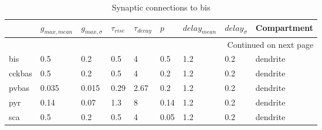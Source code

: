 \begin{longtable}{lllllllll}
\caption{Synaptic connections to bis}\label{bis_synapses}\\
\toprule
{} &   $g_{max, mean}$ & $g_{max, \sigma}$ & $\tau_{rise}$ & $\tau_{decay}$ &  $p$ & $delay_{mean}$ & $delay_{\sigma}$ & Compartment \\
\midrule
\endhead
\midrule
\multicolumn{9}{r}{{Continued on next page}} \\
\midrule
\endfoot

\bottomrule
\endlastfoot
bis    &    0.5 &      0.2 &      0.5 &         4 &   0.5 &   1.2 &       0.2 &      dendrite\ \\
cckbas &    0.5 &      0.2 &      0.5 &         4 &   0.2 &   1.2 &       0.2 &      dendrite\ \\
pvbas  &  0.035 &    0.015 &     0.29 &      2.67 &   0.2 &   1.2 &       0.2 &      dendrite\ \\
pyr    &   0.14 &     0.07 &      1.3 &         8 &  0.14 &   1.2 &       0.2 &      dendrite\ \\
sca    &    0.5 &      0.2 &      0.5 &         4 &  0.05 &   1.2 &       0.2 &      dendrite\ \\
\end{longtable}
